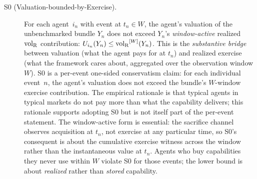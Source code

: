 \begin{description}
\item[S0 (Valuation-bounded-by-Exercise).] For each agent~$i_n$
  with event at $t_n \in W$, the agent's valuation of the
  unbenchmarked bundle $Y_n$ does not exceed $Y_n$'s
  \emph{window-active} realized ${\operatorname{vol}_{\mathrm{R}}}$ contribution:
  $U_{i_{n}}(Y_n) \leq {\operatorname{vol}_{\mathrm{R}}}^{[W]}(Y_n)$.
  This is the \emph{substantive bridge} between valuation (what
  the agent pays for at $t_n$) and realized exercise (what the
  framework cares about, aggregated over the observation window
  $W$).  S0 is a per-event one-sided conservatism claim: for
  each individual event~$n$, the agent's valuation does not
  exceed the bundle's $W$-window exercise contribution.  The
  empirical rationale is that typical agents in typical markets
  do not pay more than what the capability delivers; this
  rationale supports adopting S0 but is not itself part of the
  per-event statement.  The window-active form is essential:
  the sacrifice channel observes acquisition at $t_n$, not
  exercise at any particular time, so S0's consequent is about
  the cumulative exercise witness across the window rather than
  the instantaneous value at $t_n$.  Agents who buy capabilities
  they never use within $W$ violate S0 for those events; the
  lower bound is about \emph{realized} rather than \emph{stored}
  capability.


\end{description}
